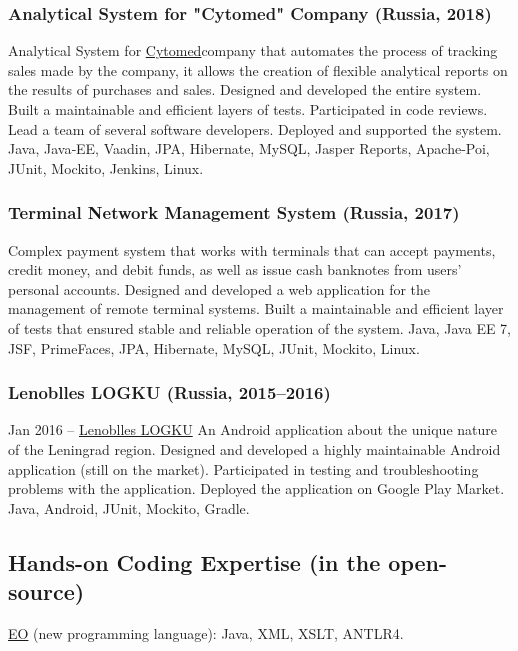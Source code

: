 \documentclass{vl}
\begin{document}
    \subsubsection*{Analytical System for "Cytomed" Company (Russia, 2018)}
    Analytical System for \href{https://cytomed.ru/en/}{Cytomed}company that automates the process of tracking sales
    made by the company, it allows the creation of flexible analytical reports on the results of purchases and sales.
    Designed and developed the entire system.
    Built a maintainable and efficient layers of tests.
    Participated in code reviews.
    Lead a team of several software developers.
    Deployed and supported the system.
    Java, Java‐EE, Vaadin, JPA, Hibernate, MySQL, Jasper Reports, Apache-Poi, JUnit, Mockito, Jenkins, Linux.

    \subsubsection*{Terminal Network Management System (Russia, 2017)}
    Complex payment system that works with terminals that can accept payments, credit money, and debit funds,
    as well as issue cash banknotes from users' personal accounts.
    Designed and developed a web application for the management of remote terminal systems.
    Built a maintainable and efficient layer of tests that ensured stable and reliable operation of the system.
    Java, Java EE 7, JSF, PrimeFaces, JPA, Hibernate, MySQL, JUnit, Mockito, Linux.

    \subsubsection*{Lenoblles LOGKU (Russia, 2015--2016)}
    Jan 2016 – \href{https://play.google.com/store/apps/details?id=com.altinntech.oopt_lo}{Lenoblles LOGKU}
    An Android application about the unique nature of the Leningrad region.
    Designed and developed a highly maintainable Android application (still on the market).
    Participated in testing and troubleshooting problems with the application.
    Deployed the application on Google Play Market.
    Java, Android, JUnit, Mockito, Gradle.

    \subsection*{Hands-on Coding Expertise (in the open-source)}

    \href{https://www.eolang.org}{EO} (new programming language):
    Java, XML, XSLT, ANTLR4.
\end{document}
